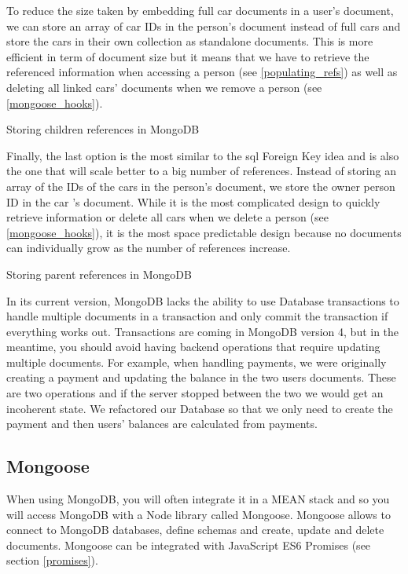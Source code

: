 \documentclass[twoside, openright,11pt,a4paper]{book}
\newenvironment{code}{\captionsetup{type=listing}}{}
\begin{document}
To reduce the size taken by embedding full car documents in a user's document, we can store an array of car IDs in the person's document\cite{mongo:doc:refs:linkingRefs} instead of full cars and store the cars in their own collection as standalone documents. This is more efficient in term of document size but it means that we have to retrieve the referenced information when accessing a person (see \ref{populating_refs}) as well as deleting all linked cars' documents when we remove a person (see \ref{mongoose_hooks}). \\

\begin{code}
	\caption{Storing children references in MongoDB}
\end{code}

Finally, the last option\cite{mongo:doc:refs:linkingRefs} is the most similar to the \gls{sql} Foreign Key idea and is also the one that will scale better to a big number of references. Instead of storing an array of the IDs of the cars in the person's document, we store the owner person ID in the car 's document. While it is the most complicated design to quickly retrieve information or delete all cars when we delete a person (see \ref{mongoose_hooks}), it is the most space predictable design because no documents can individually grow as the number of references increase.\\

\begin{code}
	\caption{Storing parent references in MongoDB}
\end{code}

In its current version, MongoDB lacks the ability to use Database transactions to handle multiple documents in a transaction and only commit the transaction if everything works out. Transactions are coming in MongoDB version 4, but in the meantime, you should avoid having backend operations that require updating multiple documents. For example, when handling payments, we were originally creating a payment and updating the balance in the two users documents. These are two operations and if the server stopped between the two we would get an incoherent state. We refactored our Database so that we only need to create the payment and then users' balances are calculated from payments.
\subsection{Mongoose}
When using MongoDB, you will often integrate it in a MEAN\cite{mean:website} stack and so you will access MongoDB with a Node library called Mongoose\cite{mongoose:website}. Mongoose allows to connect to MongoDB databases, define schemas and create, update and delete documents. Mongoose can be integrated with JavaScript ES6 Promises (see section \ref{promises}).
\end{document}

